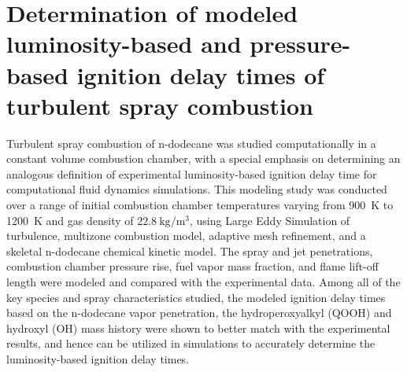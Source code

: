 \documentclass[a4paper,10pt]{article}
\begin{document}
\section{Determination of modeled luminosity-based and pressure-based ignition delay times of turbulent spray combustion}
Turbulent spray combustion of n-dodecane was studied computationally in a constant volume combustion chamber, with a special emphasis on determining an analogous definition of experimental luminosity-based ignition delay time for computational fluid dynamics simulations.
This modeling study was conducted over a range of initial combustion chamber temperatures varying from \SI{900}{\kelvin} to \SI{1200}{\kelvin} and gas density of $\SI{22.8}{\kg/\meter^3}$, using Large Eddy Simulation of turbulence, multizone combustion model, adaptive mesh refinement, and a skeletal n-dodecane chemical kinetic model.
The spray and jet penetrations, combustion chamber pressure rise, fuel vapor mass fraction, and flame lift-off length were modeled and compared with the experimental data. Among all of the key species and spray characteristics studied, the modeled ignition delay times based on the n-dodecane vapor penetration, the hydroperoxyalkyl (QOOH) and hydroxyl (OH) mass history were shown to better match with the experimental results, and hence can be utilized in simulations to accurately determine the luminosity-based ignition delay times.



\renewcommand{\refname}{References}


\end{document}
